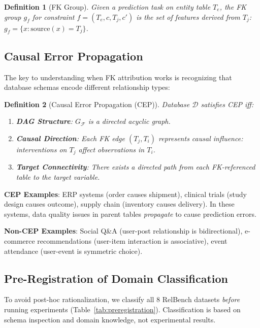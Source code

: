 \documentclass{article}
\newtheorem{definition}{Definition}
\begin{document}
\begin{definition}[FK Group]
Given a prediction task on entity table $T_e$, the FK group $g_f$ for constraint
$f = (T_e, c, T_j, c')$ is the set of features derived from $T_j$:
$g_f = \{x : \text{source}(x) = T_j\}$.
\end{definition}

\subsection{Causal Error Propagation}

The key to understanding when FK attribution works is recognizing that database
schemas encode different relationship types:

\begin{definition}[Causal Error Propagation (CEP)]
\label{def:cep}
Database $\mathcal{D}$ satisfies CEP iff:
\begin{enumerate}
    \item[(C1)] \textbf{DAG Structure}: $G_\mathcal{F}$ is a directed acyclic graph.
    \item[(C2)] \textbf{Causal Direction}: Each FK edge $(T_j, T_i)$ represents causal
    influence: interventions on $T_j$ affect observations in $T_i$.
    \item[(C3)] \textbf{Target Connectivity}: There exists a directed path from each
    FK-referenced table to the target variable.
\end{enumerate}
\end{definition}

\textbf{CEP Examples}: ERP systems (order causes shipment), clinical trials (study
design causes outcome), supply chain (inventory causes delivery). In these systems,
data quality issues in parent tables \emph{propagate} to cause prediction errors.

\textbf{Non-CEP Examples}: Social Q\&A (user-post relationship is bidirectional),
e-commerce recommendations (user-item interaction is associative), event attendance
(user-event is symmetric choice).

\subsection{Pre-Registration of Domain Classification}

To avoid post-hoc rationalization, we classify all 8 RelBench datasets \emph{before}
running experiments (Table~\ref{tab:preregistration}). Classification is based on
schema inspection and domain knowledge, not experimental results.
\end{document}
